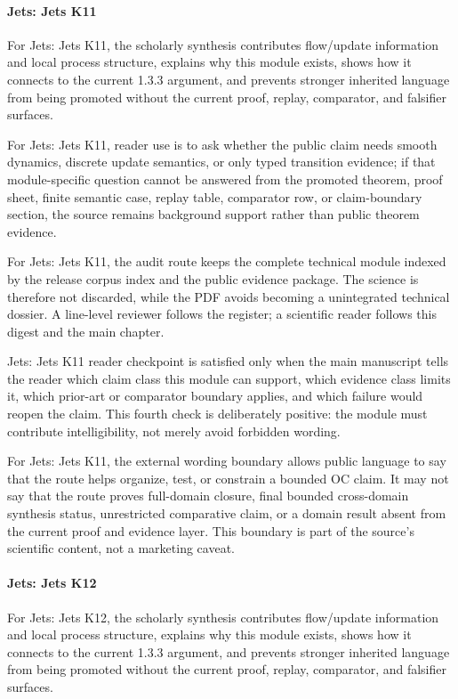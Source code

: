 \paragraph{Jets: Jets K11}

For Jets: Jets K11, the scholarly synthesis contributes flow/update information and local process structure, explains why this module exists, shows how it connects to the current 1.3.3 argument, and prevents stronger inherited language from being promoted without the current proof, replay, comparator, and falsifier surfaces.


For Jets: Jets K11, reader use is to ask whether the public claim needs smooth dynamics, discrete update semantics, or only typed transition evidence; if that module-specific question cannot be answered from the promoted theorem, proof sheet, finite semantic case, replay table, comparator row, or claim-boundary section, the source remains background support rather than public theorem evidence.


For Jets: Jets K11, the audit route keeps the complete technical module indexed by the release corpus index and the public evidence package. The science is therefore not discarded, while the PDF avoids becoming a unintegrated technical dossier. A line-level reviewer follows the register; a scientific reader follows this digest and the main chapter.


Jets: Jets K11 reader checkpoint is satisfied only when the main manuscript tells the reader which claim class this module can support, which evidence class limits it, which prior-art or comparator boundary applies, and which failure would reopen the claim. This fourth check is deliberately positive: the module must contribute intelligibility, not merely avoid forbidden wording.


For Jets: Jets K11, the external wording boundary allows public language to say that the route helps organize, test, or constrain a bounded OC claim. It may not say that the route proves full-domain closure, final bounded cross-domain synthesis status, unrestricted comparative claim, or a domain result absent from the current proof and evidence layer. This boundary is part of the source's scientific content, not a marketing caveat.


\paragraph{Jets: Jets K12}

For Jets: Jets K12, the scholarly synthesis contributes flow/update information and local process structure, explains why this module exists, shows how it connects to the current 1.3.3 argument, and prevents stronger inherited language from being promoted without the current proof, replay, comparator, and falsifier surfaces.


